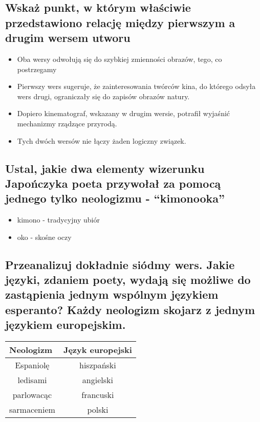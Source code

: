\documentclass[a4paper]{article}
\begin{document}
\subsection{Wskaż punkt, w którym właściwie przedstawiono re\-lację między pierwszym a drugim wersem utworu}
\begin{itemize}
    \item Oba wersy odwołują się do szybkiej zmienności obrazów, tego, co postrze\-gamy
    \item Pierwszy wers sugeruje, że zainteresowania twórców kina, do którego odsy\-ła wers drugi, ograniczały się do zapisów obrazów natury.
    \item Dopiero kinematograf, wskazany w drugim wersie, potrafił wyjaśnić mechanizmy rządzące przyrodą.
    \item Tych dwóch wersów nie łączy żaden logiczny związek.
\end{itemize}
\subsection{Ustal, jakie dwa elementy wizerunku Japończyka poeta przywołał za pomocą jednego tylko neologizmu - ``kimonooka''}
\begin{itemize}
    \item kimono - tradycyjny ubiór
    \item oko - skośne oczy
\end{itemize}
\subsection{Przeanalizuj dokładnie siódmy wers. Jakie języki, zdaniem poety, wydają się możliwe do zastąpienia jednym wspólnym językiem esperanto? Każdy neologizm skojarz z jednym językiem europejskim.}
\begin{table}[H]
    \centering
    \begin{tabular}{|c|c|}
    \hline
    \multicolumn{1}{|l|}{\textbf{Neologizm}} & \multicolumn{1}{l|}{\textbf{Język europejski}} \\ \hline
    Espaniolę & hiszpański \\ \hline
    ledisami & angielski \\ \hline
    parlowacąc & francuski \\ \hline
    sarmaceniem & polski \\ \hline
    \end{tabular}
\end{table}
\end{document}
